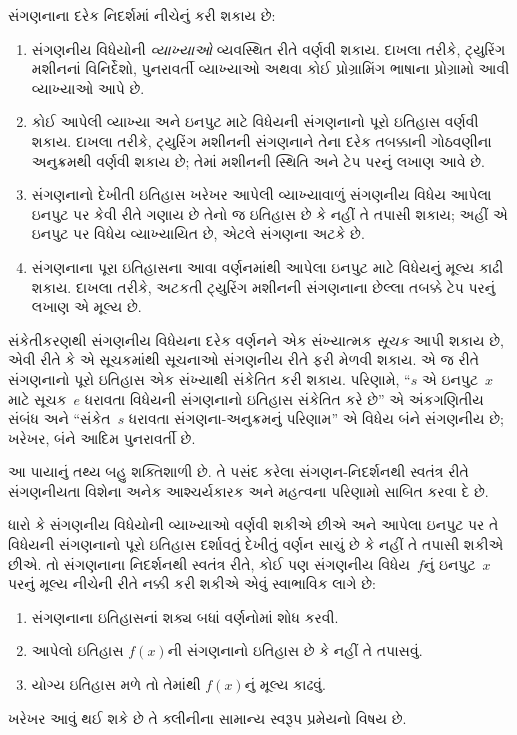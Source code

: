 \begingroup
\makeatletter{}\makeatother

\label{guunit:OLP-0230}


સંગણનાના દરેક નિદર્શમાં નીચેનું કરી શકાય છે:
\begin{enumerate}
\item સંગણનીય વિધેયોની \emph{વ્યાખ્યાઓ} વ્યવસ્થિત રીતે વર્ણવી શકાય.
  દાખલા તરીકે, ટ્યુરિંગ મશીનનાં વિનિર્દેશો, પુનરાવર્તી વ્યાખ્યાઓ
  અથવા કોઈ પ્રોગ્રામિંગ ભાષાના પ્રોગ્રામો આવી વ્યાખ્યાઓ આપે છે.
\item કોઈ આપેલી વ્યાખ્યા અને ઇનપુટ માટે વિધેયની સંગણનાનો પૂરો
  ઇતિહાસ વર્ણવી શકાય. દાખલા તરીકે, ટ્યુરિંગ મશીનની સંગણનાને
  તેના દરેક તબક્કાની ગોઠવણીના અનુક્રમથી વર્ણવી શકાય છે; તેમાં
  મશીનની સ્થિતિ અને ટેપ પરનું લખાણ આવે છે.
\item સંગણનાનો દેખીતી ઇતિહાસ ખરેખર આપેલી વ્યાખ્યાવાળું સંગણનીય
  વિધેય આપેલા ઇનપુટ પર કેવી રીતે ગણાય છે તેનો જ ઇતિહાસ છે કે
  નહીં તે તપાસી શકાય; અહીં એ ઇનપુટ પર વિધેય વ્યાખ્યાયિત છે,
  એટલે સંગણના અટકે છે.
\item સંગણનાના પૂરા ઇતિહાસના આવા વર્ણનમાંથી આપેલા ઇનપુટ માટે
  વિધેયનું મૂલ્ય કાઢી શકાય. દાખલા તરીકે, અટકતી ટ્યુરિંગ મશીનની
  સંગણનાના છેલ્લા તબક્કે ટેપ પરનું લખાણ એ મૂલ્ય છે.
\end{enumerate}

સંકેતીકરણથી સંગણનીય વિધેયના દરેક વર્ણનને એક સંખ્યાત્મક
\emph{સૂચક} આપી શકાય છે, એવી રીતે કે એ સૂચકમાંથી સૂચનાઓ
સંગણનીય રીતે ફરી મેળવી શકાય. એ જ રીતે સંગણનાનો પૂરો ઇતિહાસ
એક સંખ્યાથી સંકેતિત કરી શકાય. પરિણામે, ``$s$ એ ઇનપુટ~$x$
માટે સૂચક~$e$ ધરાવતા વિધેયની સંગણનાનો ઇતિહાસ સંકેતિત કરે છે''
એ અંકગણિતીય સંબંધ અને ``સંકેત~$s$ ધરાવતા સંગણના-અનુક્રમનું
પરિણામ'' એ વિધેય બંને સંગણનીય છે; ખરેખર, બંને આદિમ પુનરાવર્તી છે.

આ પાયાનું તથ્ય બહુ શક્તિશાળી છે. તે પસંદ કરેલા સંગણન-નિદર્શનથી
સ્વતંત્ર રીતે સંગણનીયતા વિશેના અનેક આશ્ચર્યકારક અને મહત્વના
પરિણામો સાબિત કરવા દે છે.
\endgroup


\begingroup
\makeatletter{}\makeatother

\label{guunit:OLP-0231}


ધારો કે સંગણનીય વિધેયોની વ્યાખ્યાઓ વર્ણવી શકીએ છીએ અને આપેલા
ઇનપુટ પર તે વિધેયની સંગણનાનો પૂરો ઇતિહાસ દર્શાવતું દેખીતું
વર્ણન સાચું છે કે નહીં તે તપાસી શકીએ છીએ. તો સંગણનાના નિદર્શનથી
સ્વતંત્ર રીતે, કોઈ પણ સંગણનીય વિધેય~$f$નું ઇનપુટ~$x$ પરનું
મૂલ્ય નીચેની રીતે નક્કી કરી શકીએ એવું સ્વાભાવિક લાગે છે:
\begin{enumerate}
  \item સંગણનાના ઇતિહાસનાં શક્ય બધાં વર્ણનોમાં શોધ કરવી.
  \item આપેલો ઇતિહાસ $f(x)$ની સંગણનાનો ઇતિહાસ છે કે નહીં તે તપાસવું.
  \item યોગ્ય ઇતિહાસ મળે તો તેમાંથી $f(x)$નું મૂલ્ય કાઢવું.
\end{enumerate}
ખરેખર આવું થઈ શકે છે તે ક્લીનીના સામાન્ય સ્વરૂપ પ્રમેયનો વિષય છે.


